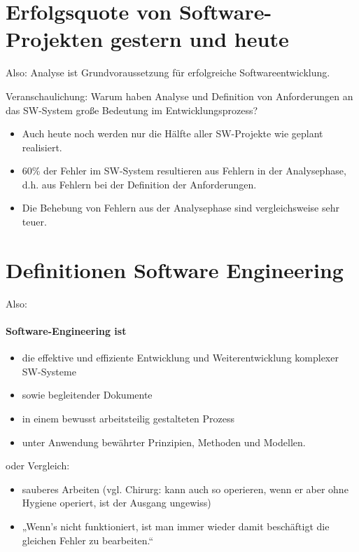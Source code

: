 \documentclass{scrreprt}
\begin{document}
\section{Erfolgsquote von Software-Projekten gestern und heute}
Also: Analyse ist Grundvoraussetzung für erfolgreiche Softwareentwicklung.

Veranschaulichung:
Warum haben Analyse und Definition von Anforderungen an das SW-System große Bedeutung
im Entwicklungsprozess?
\begin{itemize}
\item Auch heute noch werden nur die Hälfte aller SW-Projekte wie geplant realisiert.
\item 60\% der Fehler im SW-System resultieren aus Fehlern in der Analysephase, d.h. aus Fehlern bei der Definition der Anforderungen.
\item Die Behebung von Fehlern aus der Analysephase sind vergleichsweise sehr teuer.
\end{itemize}

\section{Definitionen Software Engineering}

Also:

\paragraph{Software-Engineering ist}
\begin{itemize}
\item die effektive und effiziente Entwicklung und Weiterentwicklung komplexer SW-Systeme
\item sowie begleitender Dokumente
\item in einem bewusst arbeitsteilig gestalteten Prozess
\item unter Anwendung bewährter Prinzipien, Methoden und Modellen.
\end{itemize}
oder Vergleich:
\begin{itemize}
\item sauberes Arbeiten (vgl. Chirurg: kann auch so operieren, wenn er aber ohne Hygiene operiert, ist der Ausgang ungewiss)
\item „Wenn's nicht funktioniert, ist man immer wieder damit beschäftigt die gleichen Fehler zu bearbeiten.“
\end{itemize}
\end{document}
